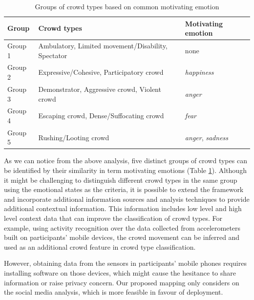 \begin{table}[!htbp]
\centering
\caption{Groups of crowd types based on common motivating emotion}
\label{table:crowdTypeGroup}
\begin{tabular}{|p{1.5cm}|p{9cm}|p{2.5cm}|}

\hline
\textbf{Group} & \textbf{Crowd types} & \textbf{Motivating emotion} \\ \hline \hline
Group 1 & Ambulatory, Limited movement/Disability, Spectator & none \\ \hline
Group 2 & Expressive/Cohesive, Participatory crowd & \textit{happiness} \\ \hline
Group 3 & Demonstrator, Aggressive crowd, Violent crowd & \textit{anger} \\ \hline
Group 4 & Escaping crowd, Dense/Suffocating crowd & \textit{fear} \\ \hline
Group 5 & Rushing/Looting crowd & \textit{anger}, \textit{sadness} \\ \hline
\end{tabular}
\end{table}

As we can notice from the above analysis, five distinct groups of crowd types can be identified by their similarity in term motivating emotions (Table \ref{table:crowdTypeGroup}). Although it might be challenging to distinguish different crowd types in the same group using the emotional states as the criteria, it is possible to extend the framework and incorporate additional information sources and analysis techniques to provide additional contextual information. This information includes low level and high level context data that can improve the classification of crowd types. For example, using activity recognition over the data collected from accelerometers built on participants' mobile devices, the crowd movement can be inferred and used as an additional crowd feature in crowd type classification. 

However, obtaining data from the sensors in participants' mobile phones requires installing software on those devices, which might cause the hesitance to share information or raise privacy concern. Our proposed mapping only considers on the social media analysis, which is more feasible in favour of deployment.

